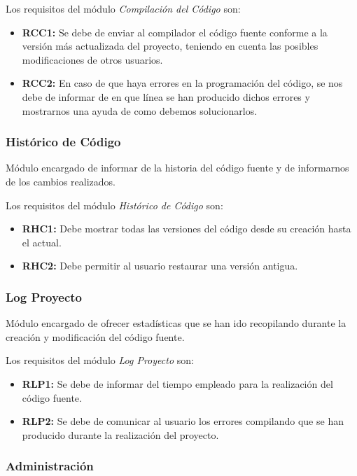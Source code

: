 Los requisitos del módulo \emph{Compilación del Código} son:

\begin{itemize}
	\item \textbf{RCC1:} Se debe de enviar al compilador el código fuente conforme a la versión más actualizada del proyecto, teniendo en cuenta las posibles modificaciones de otros usuarios.
	\item \textbf{RCC2:} En caso de que haya errores en la programación del código, se nos debe de informar de en que línea se han producido dichos errores y mostrarnos una ayuda de como debemos solucionarlos.
\end{itemize}
	
\subsubsection{Histórico de Código}

Módulo encargado de informar de la historia del código fuente y de informarnos de los cambios realizados.

Los requisitos del módulo \emph{Histórico de Código} son:

\begin{itemize}
	\item \textbf{RHC1:} Debe mostrar todas las versiones del código desde su creación hasta el actual.
	\item \textbf{RHC2:} Debe permitir al usuario restaurar una versión antigua.
\end{itemize}
	
\subsubsection{Log Proyecto}

Módulo encargado de ofrecer estadísticas que se han ido recopilando durante la creación y modificación del código fuente.

Los requisitos del módulo \emph{Log Proyecto} son:

\begin{itemize}
	\item \textbf{RLP1:} Se debe de informar del tiempo empleado para la realización del código fuente.
	\item \textbf{RLP2:} Se debe de comunicar al usuario los errores compilando que se han producido durante la realización del proyecto.
\end{itemize}
	
\subsubsection{Administración}

